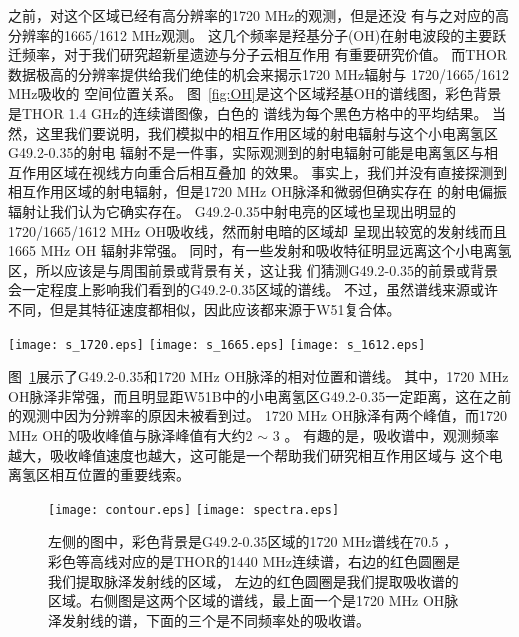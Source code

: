 之前，对这个区域已经有高分辨率的1720 MHz的观测\citep{2005ASPC..340..334B}，但是还没
有与之对应的高分辨率的1665/1612 MHz观测。
这几个频率是羟基分子(OH)在射电波段的主要跃迁频率，对于我们研究超新星遗迹与分子云相互作用
有重要研究价值。
而THOR数据极高的分辨率提供给我们绝佳的机会来揭示1720 MHz辐射与 1720/1665/1612 MHz吸收的
空间位置关系。
图~\ref{fig:OH}是这个区域羟基OH的谱线图，彩色背景是THOR 1.4 GHz的连续谱图像，白色的
谱线为每个黑色方格中的平均结果。
当然，这里我们要说明，我们模拟中的相互作用区域的射电辐射与这个小电离氢区G49.2-0.35的射电
辐射不是一件事，实际观测到的射电辐射可能是电离氢区与相互作用区域在视线方向重合后相互叠加
的效果。
事实上，我们并没有直接探测到相互作用区域的射电辐射，但是1720 MHz OH脉泽和微弱但确实存在
的射电偏振辐射让我们认为它确实存在。
G49.2-0.35中射电亮的区域也呈现出明显的1720/1665/1612 MHz OH吸收线，然而射电暗的区域却
呈现出较宽的发射线而且1665 MHz OH 辐射非常强。
同时，有一些发射和吸收特征明显远离这个小电离氢区，所以应该是与周围前景或背景有关，这让我
们猜测G49.2-0.35的前景或背景会一定程度上影响我们看到的G49.2-0.35区域的谱线。
不过，虽然谱线来源或许不同，但是其特征速度都相似，因此应该都来源于W51复合体。

\begin{figure*}
   \centering
   \texttt{[image: s\_1720.eps]}
   \texttt{[image: s\_1665.eps]}
   \texttt{[image: s\_1612.eps]}
   \caption{三幅图分别展示了G49.2-0.35区域三个频率(1720/1665/1612 MHz)的OH谱线图。
   彩色背景是THOR数据的1440 MHz连续谱图像。谱线是每一个黑色方格区域中中-58.5 。第一幅图中，区域$49.16^{\circ}<l<49.19^{\circ}$,
   $-0.34^{\circ}<b<-0.31^{\circ}$中的标度与其它区域不同，因为这个区域里的1720 MHz OH
   脉泽非常强，如果使用相同标度其谱线就超出整个图形了，所以这个区域的谱线强度是除了20的。}
\label{fig:OH}
\end{figure*}

图~\ref{fig:spectra}展示了G49.2-0.35和1720 MHz OH脉泽的相对位置和谱线。
其中，1720 MHz OH脉泽非常强，而且明显距W51B中的小电离氢区G49.2-0.35一定距离，这在之前
的观测中因为分辨率的原因未被看到过。
1720 MHz OH脉泽有两个峰值，而1720 MHz OH的吸收峰值与脉泽峰值有大约2 $\sim$ 3 。
有趣的是，吸收谱中，观测频率越大，吸收峰值速度也越大，这可能是一个帮助我们研究相互作用区域与
这个电离氢区相互位置的重要线索。

\begin{figure}
   \centering
   \texttt{[image: contour.eps]}
   \texttt{[image: spectra.eps]}
   \caption{左侧的图中，彩色背景是G49.2-0.35区域的1720 MHz谱线在70.5 ，
   彩色等高线对应的是THOR的1440 MHz连续谱，右边的红色圆圈是我们提取脉泽发射线的区域，
   左边的红色圆圈是我们提取吸收谱的区域。右侧图是这两个区域的谱线，最上面一个是1720 MHz
   OH脉泽发射线的谱，下面的三个是不同频率处的吸收谱。}
  \label{fig:spectra}
\end{figure}

